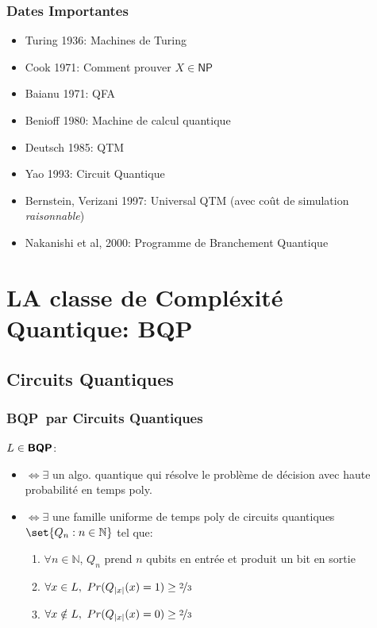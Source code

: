 \documentclass{beamer}
\newcommand{\bqp}{\textsf{\textbf{BQP}}}
\begin{document}
\begin{frame}
  \frametitle{Dates Importantes}

  \begin{itemize}
    \item Turing 1936: Machines de Turing
    \item Cook 1971: Comment prouver $X \in \textsf{NP}$
    \item Baianu 1971: QFA
    \item Benioff 1980: Machine de calcul quantique
    \item Deutsch 1985: QTM
    \item Yao 1993: Circuit Quantique
    \item Bernstein, Verizani 1997: Universal QTM (avec co\^ut de simulation \emph{raisonnable})
    \item Nakanishi et al, 2000: Programme de Branchement Quantique
  \end{itemize}
\end{frame}


\section{\textbf{LA} classe de Compl\'exit\'e Quantique: \bqp}

\subsection{Circuits Quantiques}

\begin{frame}
  \frametitle{\bqp \ par Circuits Quantiques}

  $L \in \bqp$:
  \begin{itemize}
    \item $\iff \exists$ un algo. quantique qui r\'esolve le probl\`eme de d\'ecision avec haute probabilit\'e en temps poly.
    \item $\iff \exists$ une famille uniforme de temps poly de circuits quantiques $\set{Q_n:n\in \mathbb{N}}$ tel que:
          \begin{enumerate}
            \item $\forall n \in \mathbb{N}$, $Q_n$ prend $n$ qubits en entr\'ee et produit un bit en sortie
            \item $\forall x \in L,\ Pr(Q_{|x|}(x) = 1) \geq \nicefrac{2}{3}$
            \item $\forall x \notin L,\ Pr(Q_{|x|}(x) = 0) \geq \nicefrac{2}{3}$
          \end{enumerate}
  \end{itemize}
\end{frame}
\end{document}
